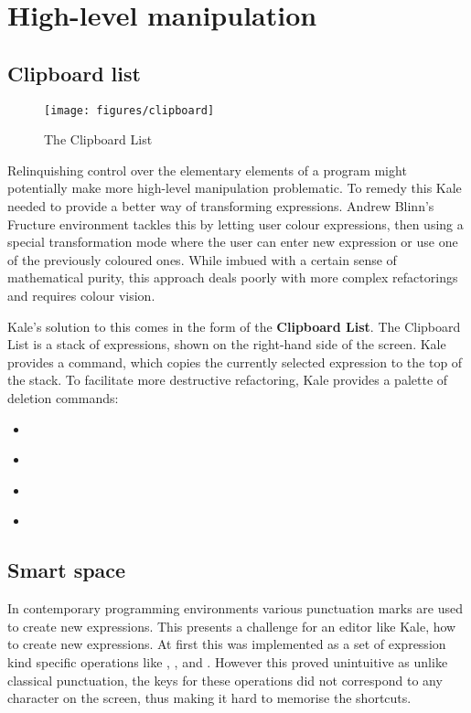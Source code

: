\documentclass[11pt]{report}
\begin{document}
\section{High-level manipulation}



\subsection{Clipboard list}
\begin{wrapfigure}[11]{R}{0.pt}
	\texttt{[image: figures/clipboard]}
	\caption{The Clipboard List}
\end{wrapfigure}

Relinquishing control over the elementary elements of a program might
potentially make more high-level manipulation problematic. To remedy this
Kale needed to provide a better way of transforming expressions. Andrew Blinn's
Fructure \cite{Fructure} environment tackles this by letting user colour
expressions, then
using a special transformation mode where the user can enter new expression or
use one of the previously coloured ones. While imbued with a certain sense of
mathematical purity, this approach deals poorly with more complex refactorings
and requires colour vision.

Kale's solution to this comes in the form of the \textbf{Clipboard List}. The
Clipboard List is a stack of expressions, shown on the right-hand side of the
screen. Kale provides a \hyperref[cmd:copy]{}  command, which
copies
the
currently
selected expression to the top of the stack. To facilitate more destructive
refactoring, Kale provides a palette of deletion commands:

\begin{itemize}[noitemsep]
	\item \hyperref[cmd:delete]{} \keys{\backspace}
	\item \hyperref[cmd:cut]{} 
	\item \hyperref[cmd:delete_blank]{} 
	\item \hyperref[cmd:cut_blank]{} 
\end{itemize}

\subsection{Smart space}
In contemporary programming environments various punctuation marks are used to
create new expressions. This presents a challenge for an editor like Kale, how
to create new expressions. At first this was implemented as a set of
expression kind specific operations like , , and . However this proved unintuitive as
unlike classical punctuation, the keys for these operations did not correspond
to any character on the screen, thus making it hard to memorise the shortcuts.
\end{document}
